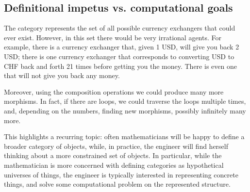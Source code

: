 


\subsection{Definitional impetus   vs. computational goals  }

The category \Curr represents the set of all possible currency exchangers that could
ever exist. However, in this set there would be very irrational agents. For example, there is a currency exchanger that, given 1 USD, will give you back 2 USD; there is one currency exchanger that 
corresponds to converting USD to CHF back and forth 21 times before getting you the money. There is even one that will not give you back any money. 

Moreover, using the composition operations we could produce many more morphisms. In fact, if there are loops, we could traverse the loops multiple times, and, depending on the numbers, finding new morphisms, possibly infinitely many more.

This highlights a recurring topic: often mathematicians will be happy to define a broader category of objects, while, in practice, the engineer will find herself thinking about a more constrained set of objects. 
In particular, while the mathematician is more concerned with defining categories as hypothetical universes of things, the engineer is typically interested in representing concrete things, and solve some computational problem on the represented structure. 

